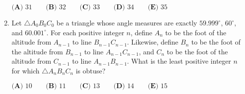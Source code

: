 \documentclass{article}
\begin{document}
\begin{enumerate}[label=\arabic*., itemsep=0.5em]
\(\textbf{(A) } 31 \qquad \textbf{(B) } 32 \qquad \textbf{(C) } 33 \qquad \textbf{(D) } 34 \qquad \textbf{(E) } 35\)\par \vspace{0.5em}\item Let \(\triangle A_0B_0C_0\) be a triangle whose angle measures are exactly \(59.999^\circ\), \(60^\circ\), and \(60.001^\circ\). For each positive integer \(n\), define \(A_n\) to be the foot of the altitude from \(A_{n-1}\) to line \(B_{n-1}C_{n-1}\). Likewise, define \(B_n\) to be the foot of the altitude from \(B_{n-1}\) to line \(A_{n-1}C_{n-1}\), and \(C_n\) to be the foot of the altitude from \(C_{n-1}\) to line \(A_{n-1}B_{n-1}\). What is the least positive integer \(n\) for which \(\triangle A_nB_nC_n\) is obtuse?

\(\textbf{(A) } 10 \qquad \textbf{(B) }11 \qquad \textbf{(C) } 13\qquad \textbf{(D) } 14 \qquad \textbf{(E) } 15\)\par \vspace{0.5em}\end{enumerate}
\end{document}
